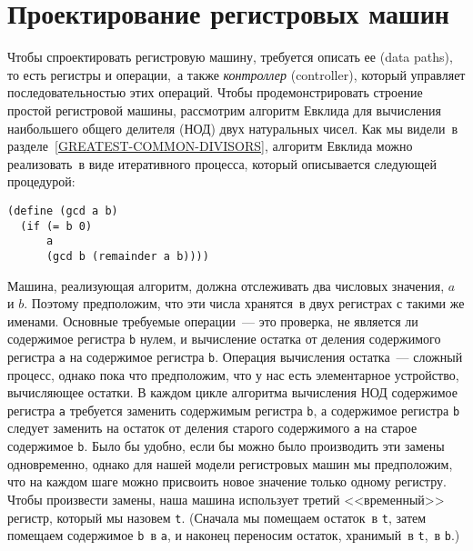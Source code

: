 \section{Проектирование регистровых машин}
\label{DESIGNING-REGISTER-MACHINES}


 Чтобы спроектировать регистровую машину, требуется описать ее
 (data paths), то
есть регистры и  операции,~а 
также 
{\em контроллер} (controller), который управляет
последовательностью этих операций.  Чтобы продемонстрировать
строение простой регистровой машины, рассмотрим алгоритм Евклида
для вычисления наибольшего общего делителя (НОД)
двух натуральных чисел.  Как мы видели~в 
разделе~\ref{GREATEST-COMMON-DIVISORS}, 
алгоритм Евклида можно
реализовать~в виде итеративного процесса, который описывается
следующей процедурой:

\begin{Verbatim}[fontsize=\small]
(define (gcd a b)
  (if (= b 0)
      a
      (gcd b (remainder a b))))
\end{Verbatim}

Машина, реализующая алгоритм, должна отслеживать 
два числовых значения, $a$ и $b$. Поэтому
предположим, что эти числа хранятся~в двух регистрах с такими же именами. Основные
требуемые операции~--- это проверка, не является ли содержимое регистра
{\tt b} нулем, и вычисление остатка от деления содержимого
регистра {\tt a} на содержимое регистра {\tt b}.
Операция вычисления остатка~--- сложный процесс, однако пока что
предположим, что у нас есть элементарное устройство, вычисляющее
остатки. В каждом цикле алгоритма вычисления НОД содержимое регистра
{\tt a} требуется заменить содержимым регистра {\tt b},
а содержимое регистра {\tt b} следует заменить на остаток от
деления старого содержимого {\tt a} на старое содержимое
{\tt b}.  Было бы удобно, если бы можно было производить эти
замены одновременно, однако для нашей модели регистровых машин мы
предположим, что на каждом шаге можно присвоить новое значение только
одному регистру.  Чтобы произвести замены, наша машина использует
третий <<временный>> регистр, который мы назовем
{\tt t}. (Сначала мы помещаем остаток~в {\tt t}, затем
помещаем содержимое {\tt b}~в {\tt a}, и наконец
переносим остаток, хранимый~в {\tt t},~в {\tt b}.)

